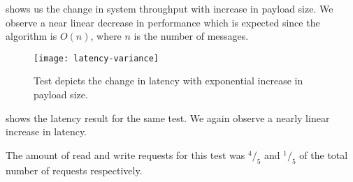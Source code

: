  shows us the change in system throughput
with increase in payload size. We observe a near linear decrease in performance
which is expected since the algorithm is $O(n)$, where $n$ is the number of
messages.

\begin{figure}
  \begin{whole}
    \texttt{[image: latency-variance]}
    \caption[Payload Latency Test]{%
      Test depicts the change in latency with exponential increase in payload
      size.
    }
    \label{figure:res.payload.latency}
  \end{whole}
\end{figure}

 shows the latency result for the same test. We
again observe a nearly linear increase in latency.

The amount of read and write requests for this test was ${}^4/_5$ and
${}^1/_5$ of the total number of requests respectively.

